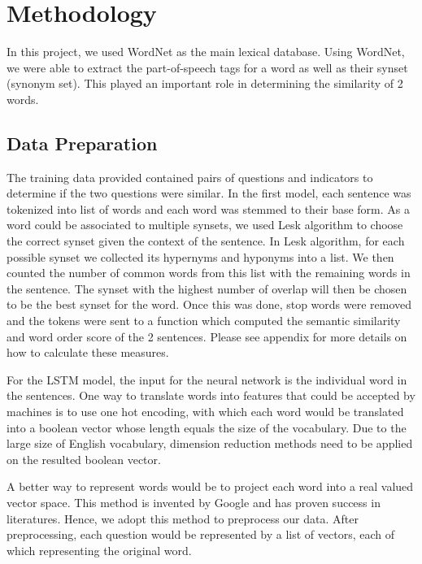 \section{Methodology}
In this project, we used WordNet as the main lexical database. Using WordNet, we were able to extract the part-of-speech tags for a word as well as their synset (synonym set). This played an important role in determining the similarity of 2 words.

\subsection{Data Preparation}
The training data provided contained pairs of questions and indicators to determine if the two questions were similar. In the first model, each sentence was tokenized into list of words and each word was stemmed to their base form. As a word could be associated to multiple synsets, we used Lesk algorithm to choose the correct synset given the context of the sentence. In Lesk algorithm, for each possible synset we collected its hypernyms and hyponyms into  a list. We then counted the number of common words from this list with the remaining words in the sentence. The synset with the highest number of overlap will then be chosen to be the best synset for the word. Once this was done, stop words were removed and the tokens were sent to a function which computed the semantic similarity and word order score of the 2 sentences. Please see appendix for more details on how to calculate these measures. 

For the LSTM model, the input for the neural network is the individual word in the sentences. One way to translate words into features that could be accepted by machines is to use one hot encoding, with which each word would be translated into a boolean vector whose length equals the size of the vocabulary. Due to the large size of English vocabulary, dimension reduction methods need to be applied on the resulted boolean vector. 

A better way to represent words would be to project each word into a real valued vector space. This method is invented by Google and has proven success in literatures. Hence, we adopt this method to preprocess our data. After preprocessing, each question would be represented by a list of vectors, each of which representing the original word.

